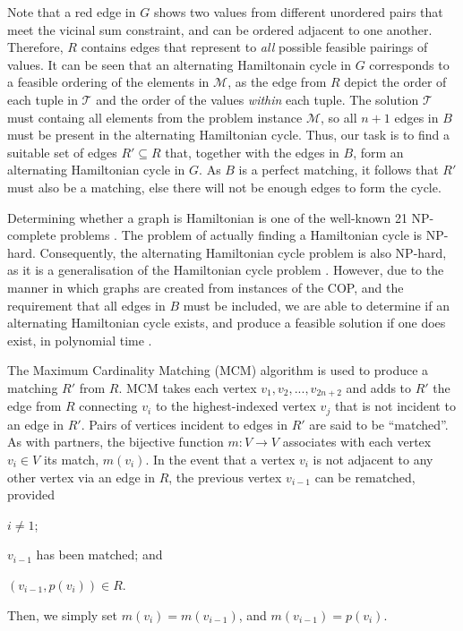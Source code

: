 \documentclass{elsarticle}
\begin{document}
Note that a red edge in $G$ shows two values from different unordered pairs that meet the vicinal sum constraint, and can be ordered adjacent to one another. Therefore, $R$ contains edges that represent to \emph{all} possible feasible pairings of values. It can be seen that an alternating Hamiltonain cycle in $G$ corresponds to a feasible ordering of the elements in $\mathcal{M}$, as the edge from $R$ depict the order of each tuple in $\mathcal{T}$ and the order of the values \emph{within} each tuple. The solution $\mathcal{T}$ must containg all elements from the problem instance $\mathcal{M}$, so all $n+1$ edges in $B$ must be present in the alternating Hamiltonian cycle. Thus, our task is to find a suitable set of edges $R' \subseteq R$ that, together with the edges in $B$, form an alternating Hamiltonian cycle in $G$. As $B$ is a perfect matching, it follows that $R'$ must also be a matching, else there will not be enough edges to form the cycle.

Determining whether a graph is Hamiltonian is one of the well-known 21 NP-complete problems \cite{karp1972}. The problem of actually finding a Hamiltonian cycle is NP-hard. Consequently, the alternating Hamiltonian cycle problem is also NP-hard, as it is a generalisation of the Hamiltonian cycle problem \cite{haggkvist1977}. However, due to the manner in which graphs are created from instances of the COP, and the requirement that all edges in $B$ must be included, we are able to determine if an alternating Hamiltonian cycle exists, and produce a feasible solution if one does exist, in polynomial time \cite{hawa2018}.

The Maximum Cardinality Matching (MCM) algorithm is used to produce a matching $R'$ from $R$. MCM takes each vertex $v_1, v_2,...,v_{2n+2}$ and adds to $R'$ the edge from $R$ connecting $v_i$ to the highest-indexed vertex $v_j$ that is not incident to an edge in $R'$. Pairs of vertices incident to edges in $R'$ are said to be ``matched''. As with partners, the bijective function $m : V \to V$ associates with each vertex $v_i \in V$ its match, $m(v_i)$. In the event that a vertex $v_i$ is not adjacent to any other vertex via an edge in $R$, the previous vertex $v_{i-1}$ can be rematched, provided 
\begin{enumerate*}[label={(\alph*)}]
	\item $i \neq 1$;
	\item $v_{i-1}$ has been matched; and
	\item $(v_{i-1}, p(v_i)) \in R$.
\end{enumerate*} 
Then, we simply set $m(v_i) = m(v_{i-1})$, and $m(v_{i-1}) = p(v_i)$.
\end{document}
